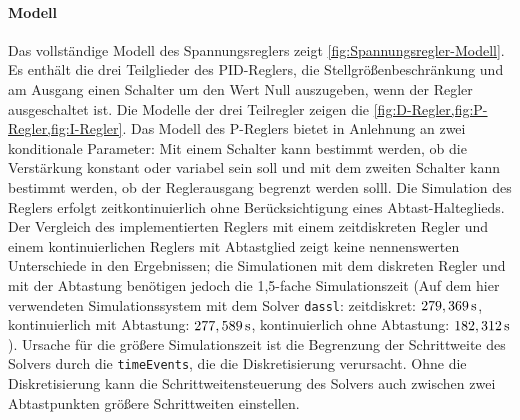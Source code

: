 \paragraph{Modell}\label{modell-Regler}
Das vollständige Modell des Spannungsreglers zeigt \cref{fig:Spannungsregler-Modell}. Es enthält die drei Teilglieder des PID-Reglers, die Stellgrößenbeschränkung und am Ausgang einen Schalter um den Wert Null auszugeben, wenn der Regler ausgeschaltet ist. Die Modelle der drei Teilregler zeigen die \cref{fig:D-Regler,fig:P-Regler,fig:I-Regler}. Das Modell des P-Reglers bietet in Anlehnung an \cite{pillerpowerssystemsDigitalerSpannungsreglerSoftwaredokumentation1997} zwei konditionale Parameter: Mit einem Schalter kann bestimmt werden, ob die Verstärkung konstant oder variabel sein soll und mit dem zweiten Schalter kann bestimmt werden, ob der Reglerausgang begrenzt werden solll. Die Simulation des Reglers erfolgt zeitkontinuierlich ohne Berücksichtigung eines Abtast-Halteglieds. Der Vergleich des implementierten Reglers mit einem zeitdiskreten Regler und einem kontinuierlichen Reglers mit Abtastglied zeigt keine nennenswerten Unterschiede in den Ergebnissen; die Simulationen mit dem diskreten Regler und mit der Abtastung benötigen jedoch die 1,5-fache Simulationszeit (Auf dem hier verwendeten Simulationssystem mit dem Solver \texttt{dassl}: zeitdiskret: $\unit[279,369]{s}$, kontinuierlich mit Abtastung: $\unit[277,589]{s}$, kontinuierlich ohne Abtastung: $\unit[182,312]{s}$). Ursache für die größere Simulationszeit ist die Begrenzung der Schrittweite des Solvers durch die \texttt{timeEvents}, die die Diskretisierung verursacht. Ohne die Diskretisierung kann die Schrittweitensteuerung des Solvers auch zwischen zwei Abtastpunkten größere Schrittweiten einstellen.
